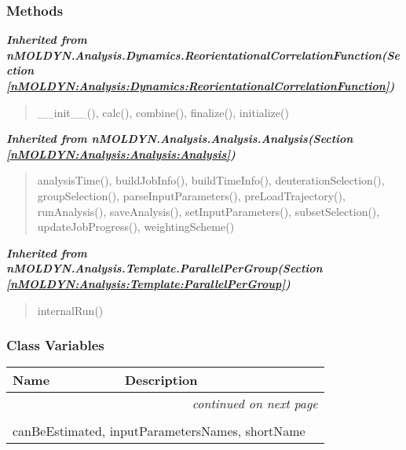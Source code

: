 
  \subsubsection{Methods}


\large{\textbf{\textit{Inherited from nMOLDYN.Analysis.Dynamics.ReorientationalCorrelationFunction\textit{(Section \ref{nMOLDYN:Analysis:Dynamics:ReorientationalCorrelationFunction})}}}}

\begin{quote}
\_\_init\_\_(), calc(), combine(), finalize(), initialize()
\end{quote}

\large{\textbf{\textit{Inherited from nMOLDYN.Analysis.Analysis.Analysis\textit{(Section \ref{nMOLDYN:Analysis:Analysis:Analysis})}}}}

\begin{quote}
analysisTime(), buildJobInfo(), buildTimeInfo(), deuterationSelection(), groupSelection(), parseInputParameters(), preLoadTrajectory(), runAnalysis(), saveAnalysis(), setInputParameters(), subsetSelection(), updateJobProgress(), weightingScheme()
\end{quote}

\large{\textbf{\textit{Inherited from nMOLDYN.Analysis.Template.ParallelPerGroup\textit{(Section \ref{nMOLDYN:Analysis:Template:ParallelPerGroup})}}}}

\begin{quote}
internalRun()
\end{quote}


  \subsubsection{Class Variables}

    \vspace{-1cm}
\hspace{\varindent}\begin{longtable}{|p{\varnamewidth}|p{\vardescrwidth}|l}
\cline{1-2}
\cline{1-2} \centering \textbf{Name} & \centering \textbf{Description}& \\
\cline{1-2}
\endhead\cline{1-2}\multicolumn{3}{r}{\small\textit{continued on next page}}\\\endfoot\cline{1-2}
\endlastfoot\multicolumn{2}{|l|}{\textit{Inherited from nMOLDYN.Analysis.Dynamics.ReorientationalCorrelationFunction \textit{(Section \ref{nMOLDYN:Analysis:Dynamics:ReorientationalCorrelationFunction})}}}\\
\multicolumn{2}{|p{\varwidth}|}{\raggedright canBeEstimated, inputParametersNames, shortName}\\
\cline{1-2}
\end{longtable}

